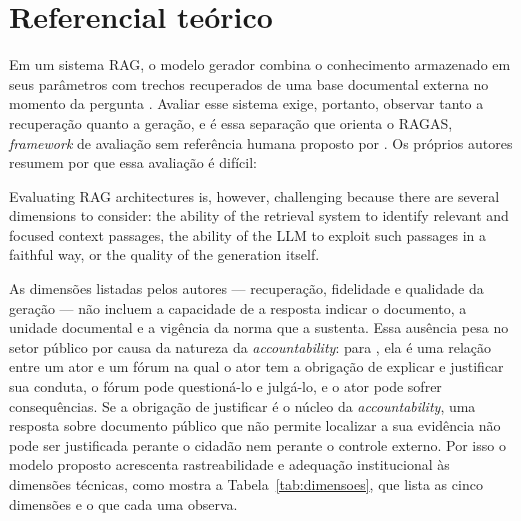 
\section{Referencial teórico}

Em um sistema RAG, o modelo gerador combina o conhecimento armazenado em seus
parâmetros com trechos recuperados de uma base documental externa no momento da
pergunta \parencite{lewis2020rag}. Avaliar esse sistema exige, portanto,
observar tanto a recuperação quanto a geração, e é essa separação que orienta o
RAGAS, \textit{framework} de avaliação sem referência humana proposto por
. Os próprios autores resumem por que essa avaliação é
difícil:

\begin{citacao}
Evaluating RAG architectures is, however, challenging because there are several
dimensions to consider: the ability of the retrieval system to identify relevant
and focused context passages, the ability of the LLM to exploit such passages in
a faithful way, or the quality of the generation itself.
\parencite{es2023ragas}
\end{citacao}

As dimensões listadas pelos autores --- recuperação, fidelidade e qualidade da
geração --- não incluem a capacidade de a resposta indicar o documento, a
unidade documental e a vigência da norma que a sustenta. Essa ausência pesa no
setor público por causa da natureza da \textit{accountability}: para
, ela é uma relação entre um ator e um
fórum na qual o ator tem a obrigação de explicar e justificar sua conduta, o
fórum pode questioná-lo e julgá-lo, e o ator pode sofrer consequências. Se a
obrigação de justificar é o núcleo da \textit{accountability}, uma resposta
sobre documento público que não permite localizar a sua evidência não pode ser
justificada perante o cidadão nem perante o controle externo. Por isso o modelo
proposto acrescenta rastreabilidade e adequação institucional às dimensões
técnicas, como mostra a Tabela~\ref{tab:dimensoes}, que lista as cinco
dimensões e o que cada uma observa.

